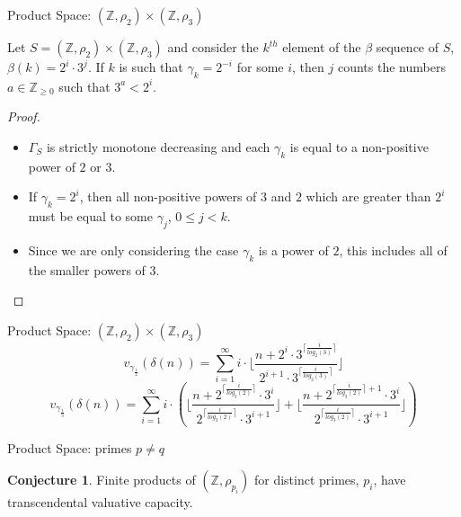 \documentclass{beamer}
\theoremstyle{definition}
\newtheorem{conjecture}{Conjecture}
\begin{document}
\begin{frame}{Product Space: $(\mathbb{Z},\rho_2) \times (\mathbb{Z},\rho_3)$}
\begin{lemma}
	Let $S = (\mathbb{Z},\rho_2) \times (\mathbb{Z},\rho_3) $ and consider the $k^{th}$ element of the $\beta$ sequence of $S$, $\beta(k) = 2^i \cdot 3^j$. If $k$ is such that $\gamma_k=2^{-i}$ for some $i$, then $j$ counts the numbers $a \in \mathbb{Z}_{\geq 0}$ such that $3^a < 2^{i}$.
\end{lemma}
\pause
\begin{proof}
	\begin{itemize}
	\item $\Gamma_S$ is strictly monotone decreasing and each $\gamma_k$ is equal to a non-positive power of $2$ or $3$. \pause
	\item If $\gamma_k = 2^i$, then all non-positive powers of $3$ and $2$ which are greater than $2^i$ must be equal to some $\gamma_j$, $0 \leq j < k$.\pause %
	\item Since we are only considering the case $\gamma_k$ is a power of $2$, this includes all of the smaller powers of $3$.
	\end{itemize}
\end{proof}
\end{frame}
\begin{frame}{Product Space: $(\mathbb{Z},\rho_2) \times (\mathbb{Z},\rho_3)$}
	 \[v_{\gamma_{\frac{1}{2}}}(\delta(n)) = \sum_{i=1}^\infty i \cdot \lfloor\frac{n + 2^i \cdot 3^{\lceil \frac{i}{log_2(3)}\rceil}}{2^{i+1}\cdot 3^{\lceil \frac{i}{log_2(3)}\rceil}} \rfloor\]
		\pause
	 \[v_{\gamma_{\frac{1}{3}}}(\delta(n)) = \sum_{i=1}^\infty i \cdot (\lfloor\frac{n + 2^{\lceil \frac{i}{log_3(2)}\rceil} \cdot 3^i}{2^{\lceil \frac{i}{log_3(2)}\rceil}\cdot 3^{i+1}} \rfloor + \lfloor\frac{n + 2^{\lceil \frac{i}{log_3(2)}\rceil+1} \cdot 3^i}{2^{\lceil \frac{i}{log_3(2)}\rceil}\cdot 3^{i+1}} \rfloor) \]
\end{frame}

\begin{frame}{Product Space: primes $p \neq q$}
\begin{conjecture} Finite products of $(\mathbb{Z}, \rho_{p_i})$ for distinct primes, $p_i$, have transcendental valuative capacity.\\ \end{conjecture}
\end{frame}
\end{document}
